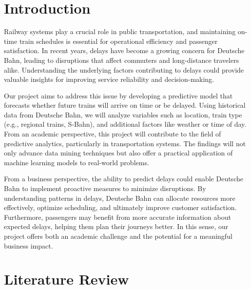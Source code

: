 \documentclass[a4paper,oneside,bibliography=totoc]{scrbook}
\begin{document}
\begingroup%
\hypersetup{hidelinks}%
\tableofcontents%
\endgroup



\mainmatter

\chapter{Introduction}
\label{ch:intro}

Railway systems play a crucial role in public transportation, and maintaining on-time train schedules is essential for operational efficiency and passenger satisfaction. In recent years, delays have become a growing concern for Deutsche Bahn, leading to disruptions that affect commuters and long-distance travelers alike. Understanding the underlying factors contributing to delays could provide valuable insights for improving service reliability and decision-making.

Our project aims to address this issue by developing a predictive model that forecasts whether future trains will arrive on time or be delayed. Using historical data from Deutsche Bahn, we will analyze variables such as location, train type (e.g., regional trains, S-Bahn), and additional factors like weather or time of day. From an academic perspective, this project will contribute to the field of predictive analytics, particularly in transportation systems. The findings will not only advance data mining techniques but also offer a practical application of machine learning models to real-world problems.

From a business perspective, the ability to predict delays could enable Deutsche Bahn to implement proactive measures to minimize disruptions. By understanding patterns in delays, Deutsche Bahn can allocate resources more effectively, optimize scheduling, and ultimately improve customer satisfaction. Furthermore, passengers may benefit from more accurate information about expected delays, helping them plan their journeys better. In this sense, our project offers both an academic challenge and the potential for a meaningful business impact.

\chapter{Literature Review}
\label{ch:related_work}
\end{document}
